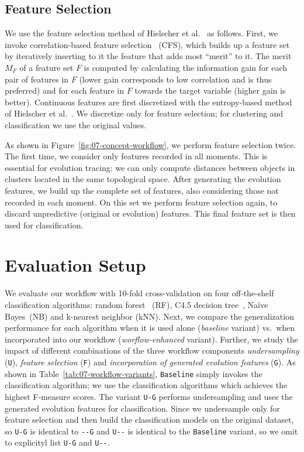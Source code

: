 \documentclass[
  oneside]{book}
\begin{document}
\hypertarget{evo-concept-feature-selection}{%
\subsection{Feature Selection}\label{evo-concept-feature-selection}}

We use the feature selection method of Hielscher et al.~\autocite{HielscherEtAl:CBMS14} as follows.
First, we invoke correlation-based feature selection~\autocite{hall2000correlation} (CFS), which builds up a feature set by iteratively inserting to it the feature that adds most ``merit'' to it.
The merit \(M_F\) of a feature set \(F\) is computed by calculating the information gain for each pair of features in \(F\) (lower gain corresponds to low correlation and is thus preferred) and for each feature in \(F\) towards the target variable (higher gain is better).
Continuous features are first discretized with the entropy-based method of Hielscher et al.~\autocite{Fayyad:MDL93}.
We discretize only for feature selection; for clustering and classification we use the original values.

As shown in Figure~\ref{fig:07-concept-workflow}, we perform feature selection twice.
The first time, we consider only features recorded in all moments.
This is essential for evolution tracing: we can only compute distances between objects in clusters located in the same topological space.
After generating the evolution features, we build up the complete set of features, also considering those not recorded in each moment.
On this set we perform feature selection again, to discard unpredictive (original or evolution) features.
This final feature set is then used for classification.

\hypertarget{evo-evaluation}{%
\section{Evaluation Setup}\label{evo-evaluation}}

We evaluate our workflow with 10-fold cross-validation on four off-the-shelf classification algorithms: random forest~\autocite{Breiman:RandomForests2001} (RF), C4.5 decision tree~\autocite{Quinlan:C4.5.1993}, Naïve Bayes~(NB) and k-nearest neighbor (kNN).
Next, we compare the generalization performance for each algorithm when it is used alone (\emph{baseline} variant) vs.~when incorporated into our workflow (\emph{worflow-enhanced} variant).
Further, we study the impact of different combinations of the three workflow components \emph{undersampling} (\texttt{U}), \emph{feature selection} (\texttt{F}) and \emph{incorporation of generated evolution features} (\texttt{G}).
As shown in Table~\ref{tab:07-workflow-variants}, \texttt{Baseline} simply invokes the classification algorithm; we use the classification algorithms which achieves the highest F-measure scores.
The variant \texttt{U-G} performs undersampling and uses the generated evolution features for classification.
Since we undersample only for feature selection and then build the classification models on the original dataset, so \texttt{U-G} is identical to \texttt{-\/-G} and \texttt{U-\/-} is identical to the \texttt{Baseline} variant, so we omit to explicityl list \texttt{U-G} and \texttt{U-\/-}.
\end{document}
